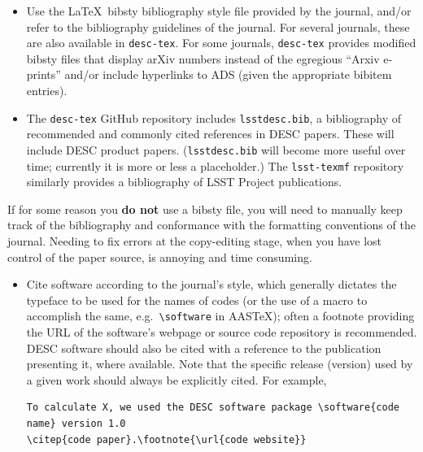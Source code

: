 \documentclass[letterpaper,11pt]{article}
\begin{document}
\begin{itemize}

\item
Use the La\TeX~bibsty bibliography style file provided by the journal, and/or refer to the bibliography guidelines of the journal.  For several journals, these are also available in {\tt desc-tex}.  For some journals,  {\tt desc-tex} provides modified bibsty files that display arXiv numbers instead of the egregious ``Arxiv e-prints'' and/or include hyperlinks to ADS (given the appropriate bibitem entries).

\item
The   {\tt desc-tex} GitHub repository includes {\tt lsstdesc.bib}, a bibliography of recommended and commonly cited references in DESC papers.  These will include DESC product papers.  ({\tt lsstdesc.bib} will become more useful over time; currently it is more or less a placeholder.) The {\tt lsst-texmf} repository similarly provides a bibliography of LSST Project publications.

\end{itemize}

If for some reason you {\bf do not} use a bibsty file, you will need to manually keep track of the bibliography and conformance with the formatting conventions of the journal.  Needing to fix errors at the copy-editing stage, when you have lost control of the paper source, is annoying and time consuming.

\begin{itemize}
\item Cite software according to the journal's style, which generally dictates the typeface to be used for the names of codes (or the use of a macro to accomplish the same, e.g.\ \verb|\software| in AASTeX); often a footnote providing the URL of the software's webpage or source code repository is recommended. DESC software should also be cited with a reference to the publication presenting it, where available. Note that the specific release (version) used by a given work should always be explicitly cited. For example,
\begin{verbatim}
To calculate X, we used the DESC software package \software{code name} version 1.0
\citep{code paper}.\footnote{\url{code website}}
\end{verbatim}
\end{itemize}
\end{document}
